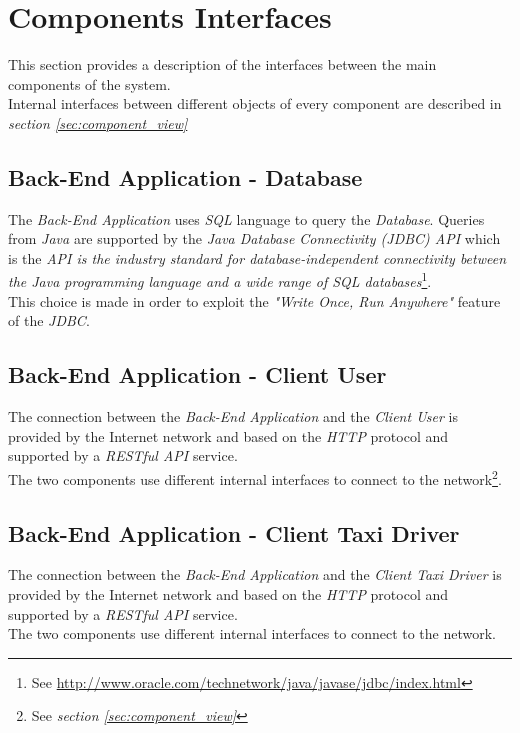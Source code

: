 \section{Components Interfaces} %
\label{sec:components_interfaces}
This section provides a description of the interfaces between the main components of the system.\\
Internal interfaces between different objects of every component are described in \emph{section \ref{sec:component_view}}
\subsection{Back-End Application - Database} %
\label{sub:back_end_application_database}
The \emph{Back-End Application} uses \emph{SQL} language to query the \emph{Database}. Queries from \emph{Java} are supported by the \emph{Java Database Connectivity (JDBC) API} which is the \emph{API is the industry standard for database-independent connectivity between the Java programming language and a wide range of SQL databases}\footnote{See \url{http://www.oracle.com/technetwork/java/javase/jdbc/index.html}}.\\
This choice is made in order to exploit the \emph{"Write Once, Run Anywhere"} feature of the \emph{JDBC}.
\subsection{Back-End Application - Client User} %
\label{sub:back_end_application_client_user}
The connection between the \emph{Back-End Application} and the \emph{Client User} is provided by the Internet network and based on the \emph{HTTP} protocol and supported by a \emph{RESTful API} service.\\
The two components use different internal interfaces to connect to the network\footnote{See \emph{section \ref{sec:component_view}}}.
\subsection{Back-End Application - Client Taxi Driver} %
\label{sub:back_end_application_client_taxi}
The connection between the \emph{Back-End Application} and the \emph{Client Taxi Driver} is provided by the Internet network and based on the \emph{HTTP} protocol and supported by a \emph{RESTful API} service.\\
The two components use different internal interfaces to connect to the network.

